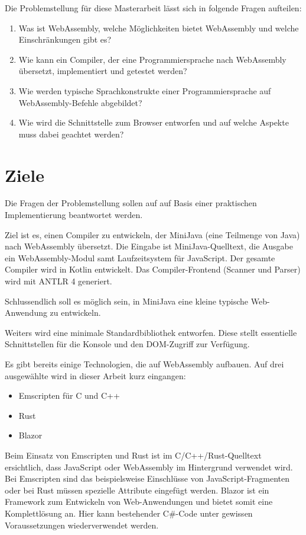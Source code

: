 Die Problemstellung für diese Masterarbeit lässt sich in folgende Fragen aufteilen:

\begin{enumerate}
	\item Was ist WebAssembly, welche Möglichkeiten bietet WebAssembly und welche Einschränkungen gibt es?
	\item Wie kann ein Compiler, der eine Programmiersprache nach WebAssembly übersetzt, implementiert und getestet werden?
	\item Wie werden typische Sprachkonstrukte einer Programmiersprache auf Web\-As\-sem\-bly-Befehle abgebildet?
	\item Wie wird die Schnittstelle zum Browser entworfen und auf welche Aspekte muss dabei geachtet werden?
\end{enumerate}

\section{Ziele}

Die Fragen der Problemstellung sollen auf auf Basis einer praktischen Implementierung beantwortet werden.

Ziel ist es, einen Compiler zu entwickeln, der MiniJava (eine Teilmenge von Java) nach WebAssembly übersetzt. Die Eingabe ist MiniJava-Quelltext, die Ausgabe ein WebAssembly-Modul samt Laufzeitsystem für JavaScript. Der gesamte Compiler wird in Kotlin entwickelt. Das Compiler-Frontend (Scanner und Parser) wird mit ANTLR 4 generiert.

Schlussendlich soll es möglich sein, in MiniJava eine kleine typische Web-Anwendung zu entwickeln.

Weiters wird eine minimale Standardbibliothek entworfen. Diese stellt essentielle Schnittstellen für die Konsole und den DOM-Zugriff zur Verfügung.

Es gibt bereits einige Technologien, die auf WebAssembly aufbauen. Auf drei ausgewählte wird in dieser Arbeit kurz eingangen:
\begin{itemize}
    \item Emscripten \cite{Emscripten} für C und C++
    \item Rust \cite{RustWasmWebsite}
    \item Blazor \cite{Blazor} 
\end{itemize}

Beim Einsatz von Emscripten und Rust ist im C/C++/Rust-Quelltext ersichtlich, dass JavaScript oder WebAssembly im Hintergrund verwendet wird. Bei Emscripten sind das beispielsweise Einschlüsse von JavaScript-Fragmenten oder bei Rust müssen spezielle Attribute eingefügt werden. Blazor ist ein Framework zum Entwickeln von Web-Anwendungen und bietet somit eine Komplettlösung an. Hier kann bestehender C\#{}-Code unter gewissen Voraussetzungen wiederverwendet werden.


